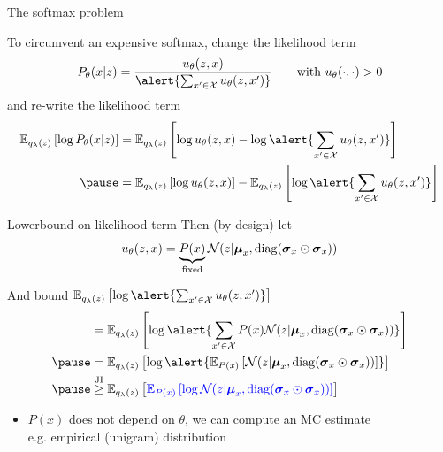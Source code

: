 \begin{frame}{The softmax problem}

To circumvent an expensive softmax, change the likelihood term
\begin{equation*}
P_\theta(x|z) = \frac{u_\theta(z, x)}{\alert{\sum_{x' \in \mathcal X} u_\theta(z, x')}} \qquad \text{with } u_\theta(\cdot, \cdot) > 0
\end{equation*}
\pause
and re-write the likelihood term
\begin{equation*}
\begin{aligned}
\mathbb E_{q_\lambda(z)} \left[  \log P_\theta(x|z) \right] 
 &= \mathbb E_{q_\lambda(z)} \left[  \log u_\theta(z, x) - \log \alert{\sum_{x'\in \mathcal X}u_\theta(z, x')}\right] \\ \pause
 &=\mathbb E_{q_\lambda(z)} \left[  \log u_\theta(z, x) \right] - \mathbb E_{q_\lambda(z)} \left[ \log \alert{\sum_{x'\in \mathcal X}u_\theta(z, x')}\right]
\end{aligned}
\end{equation*}


\end{frame}

\begin{frame}[plain]{Lowerbound on likelihood term}
Then (by design) let
\begin{equation*}
u_\theta(z, x) = \underbrace{P(x)}_{\text{fixed}}\mathcal N(z|\boldsymbol \mu_x, \operatorname{diag}(\boldsymbol \sigma_x \odot \boldsymbol \sigma_x))
\end{equation*}
\pause

And bound $ \mathbb E_{q_\lambda(z)} \left[ \log \alert{\sum_{x'\in \mathcal X}u_\theta(z, x')}\right] $ \pause
\begin{equation*}
\begin{aligned} 
&=\mathbb E_{q_\lambda(z)} \left[ \log \alert{\sum_{x'\in \mathcal X} P(x)\mathcal N(z|\boldsymbol \mu_x, \diag(\boldsymbol \sigma_x \odot \boldsymbol \sigma_x))} \right] \\ \pause
&=\mathbb E_{q_\lambda(z)} \left[ \log \alert{\mathbb E_{P(x)}\left[ \mathcal N(z|\boldsymbol \mu_x, \diag(\boldsymbol \sigma_x \odot \boldsymbol \sigma_x)) \right]} \right] \\ \pause
&\overset{\text{JI}}{\ge} \mathbb E_{q_\lambda(z)} \left[ \textcolor{blue}{\mathbb E_{P(x)}\left[ \log \mathcal N(z|\boldsymbol \mu_x, \diag(\boldsymbol \sigma_x \odot \boldsymbol \sigma_x)) \right]} \right]
\end{aligned}
\end{equation*}
\pause

\begin{itemize}
	\item $P(x)$ does not depend on $\theta$, we can compute an MC estimate\\
	e.g. empirical (unigram) distribution
\end{itemize}

\end{frame}



